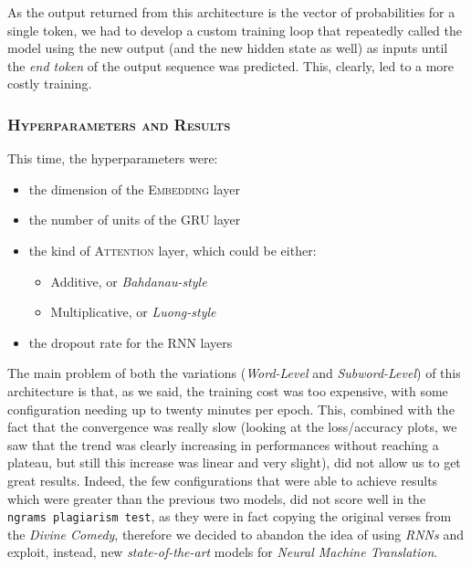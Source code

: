 As the output returned from this architecture is the vector of probabilities for a single token, we had to develop a custom training loop that repeatedly called the model using the new output (and the new hidden state as well) as inputs until the \textit{end token} of the output sequence was predicted.
This, clearly, led to a more costly training.

\subsubsection{\textsc{Hyperparameters and Results}}

This time, the hyperparameters were:
\begin{itemize}
    \item the dimension of the \textsc{Embedding} layer
    \item the number of units of the \textsc{GRU} layer
    \item the kind of \textsc{Attention} layer, which could be either:
    \begin{itemize}
        \item Additive, or \textit{Bahdanau-style} \parencite{bahdanau2014neural}
        \item Multiplicative, or \textit{Luong-style} \parencite{luong2015effective}
    \end{itemize}
    \item the dropout rate for the \textsc{RNN} layers
\end{itemize}

The main problem of both the variations (\textit{Word-Level} and \textit{Subword-Level}) of this architecture is that, as we said, the training cost was too expensive, with some configuration needing up to twenty minutes per epoch.
This, combined with the fact that the convergence was really slow (looking at the loss/accuracy plots, we saw that the trend was clearly increasing in performances without reaching a plateau, but still this increase was linear and very slight), did not allow us to get great results.
Indeed, the few configurations that were able to achieve results which were greater than the previous two models, did not score well in the \texttt{ngrams plagiarism test}, as they were in fact copying the original verses from the \textit{Divine Comedy}, therefore we decided to abandon the idea of using \textit{RNNs} and exploit, instead, new \textit{state-of-the-art} models for \textit{Neural Machine Translation}. 